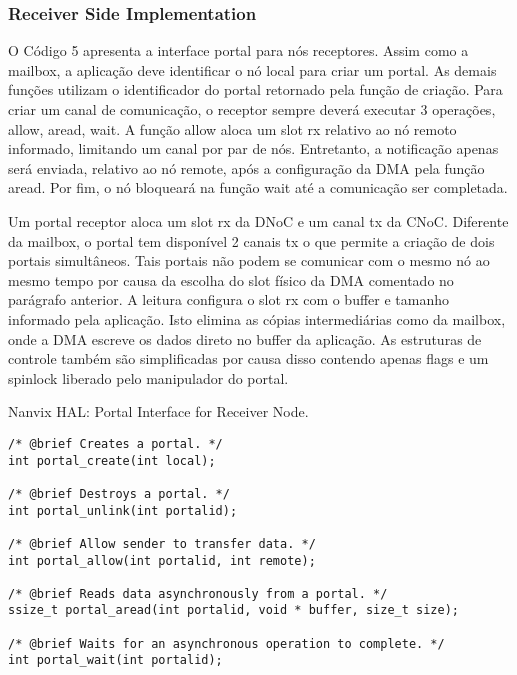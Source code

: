 			\subsubsection{Receiver Side Implementation}

				O Código 5 apresenta a interface portal para nós receptores.
				Assim como a mailbox, a aplicação deve identificar o nó local para criar um portal.
				As demais funções utilizam o identificador do portal retornado pela função de criação.
				Para criar um canal de comunicação, o receptor sempre deverá executar 3 operações, allow, aread, wait.
				A função allow aloca um slot rx relativo ao nó remoto informado, limitando um canal por par de nós.
				Entretanto, a notificação apenas será enviada, relativo ao nó remote, após a configuração da DMA pela função aread.
				Por fim, o nó bloqueará na função wait até a comunicação ser completada.

				Um portal receptor aloca um slot rx da DNoC e um canal tx da CNoC.
				Diferente da mailbox, o portal tem disponível 2 canais tx o que permite a criação de dois portais simultâneos.
				Tais portais não podem se comunicar com o mesmo nó ao mesmo tempo por causa da escolha do slot físico da DMA comentado no parágrafo anterior.
				A leitura configura o slot rx com o buffer e tamanho informado pela aplicação.
				Isto elimina as cópias intermediárias como da mailbox, onde a DMA escreve os dados direto no buffer da aplicação.
				As estruturas de controle também são simplificadas por causa disso
				contendo apenas flags e um spinlock liberado pelo manipulador do portal.

\begin{listing}[!tb]
\caption{Nanvix HAL: Portal Interface for Receiver Node.}
\label{code:hal-portal-receiver}
\begin{verbatim}
/* @brief Creates a portal. */
int portal_create(int local);

/* @brief Destroys a portal. */
int portal_unlink(int portalid);

/* @brief Allow sender to transfer data. */
int portal_allow(int portalid, int remote);

/* @brief Reads data asynchronously from a portal. */
ssize_t portal_aread(int portalid, void * buffer, size_t size);

/* @brief Waits for an asynchronous operation to complete. */
int portal_wait(int portalid);
\end{verbatim}
\end{listing}

